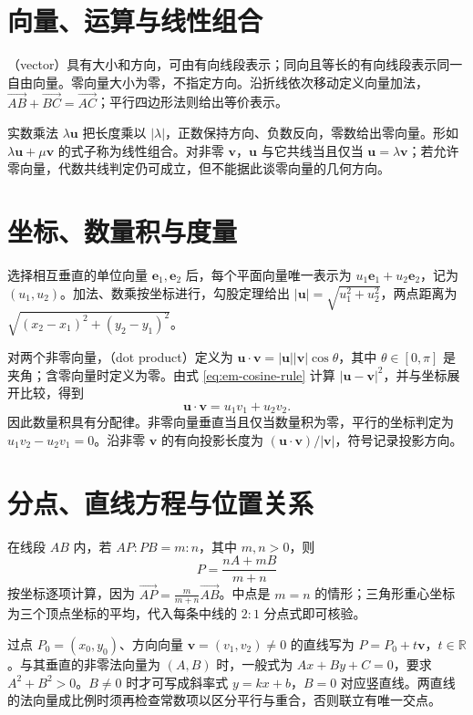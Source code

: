 \documentclass[UTF8]{ctexbook}
\begin{document}
\section{向量、运算与线性组合}
（vector）具有大小和方向，可由有向线段表示；同向且等长的有向线段表示同一自由向量。零向量大小为零，不指定方向。沿折线依次移动定义向量加法，$\overrightarrow{AB}+\overrightarrow{BC}=\overrightarrow{AC}$；平行四边形法则给出等价表示。

实数乘法 $\lambda\boldsymbol u$ 把长度乘以 $|\lambda|$，正数保持方向、负数反向，零数给出零向量。形如 $\lambda\boldsymbol u+\mu\boldsymbol v$ 的式子称为线性组合。对非零 $\boldsymbol v$，$\boldsymbol u$ 与它共线当且仅当 $\boldsymbol u=\lambda\boldsymbol v$；若允许零向量，代数共线判定仍可成立，但不能据此谈零向量的几何方向。

\section{坐标、数量积与度量}
选择相互垂直的单位向量 $\boldsymbol e_1,\boldsymbol e_2$ 后，每个平面向量唯一表示为 $u_1\boldsymbol e_1+u_2\boldsymbol e_2$，记为 $(u_1,u_2)$。加法、数乘按坐标进行，勾股定理给出 $|\boldsymbol u|=\sqrt{u_1^2+u_2^2}$，两点距离为 $\sqrt{(x_2-x_1)^2+(y_2-y_1)^2}$。

对两个非零向量，（dot product）定义为 $\boldsymbol u\cdot\boldsymbol v=|\boldsymbol u||\boldsymbol v|\cos\theta$，其中 $\theta\in[0,\pi]$ 是夹角；含零向量时定义为零。由式 \eqref{eq:em-cosine-rule} 计算 $|\boldsymbol u-\boldsymbol v|^2$，并与坐标展开比较，得到
\[
 \boldsymbol u\cdot\boldsymbol v=u_1v_1+u_2v_2.
\]
因此数量积具有分配律。非零向量垂直当且仅当数量积为零，平行的坐标判定为 $u_1v_2-u_2v_1=0$。沿非零 $\boldsymbol v$ 的有向投影长度为 $(\boldsymbol u\cdot\boldsymbol v)/|\boldsymbol v|$，符号记录投影方向。

\section{分点、直线方程与位置关系}
在线段 $AB$ 内，若 $AP:PB=m:n$，其中 $m,n>0$，则
\[
 P=\frac{nA+mB}{m+n}
\]
按坐标逐项计算，因为 $\overrightarrow{AP}=\frac m{m+n}\overrightarrow{AB}$。中点是 $m=n$ 的情形；三角形重心坐标为三个顶点坐标的平均，代入每条中线的 $2:1$ 分点式即可核验。

过点 $P_0=(x_0,y_0)$、方向向量 $\boldsymbol v=(v_1,v_2)\ne0$ 的直线写为 $P=P_0+t\boldsymbol v$，$t\in\mathbb R$。与其垂直的非零法向量为 $(A,B)$ 时，一般式为 $Ax+By+C=0$，要求 $A^2+B^2>0$。$B\ne0$ 时才可写成斜率式 $y=kx+b$，$B=0$ 对应竖直线。两直线的法向量成比例时须再检查常数项以区分平行与重合，否则联立有唯一交点。
\end{document}
